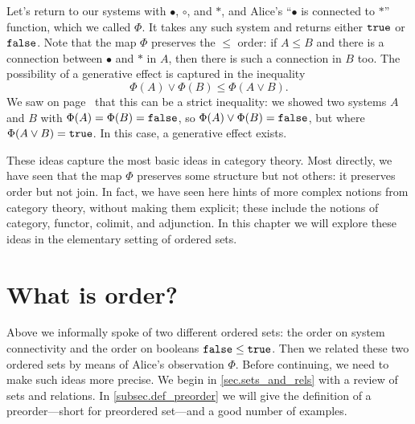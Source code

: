 \documentclass[7Sketches]{subfiles}
\begin{document}
Let's return to our systems with $\bullet$, $\circ$, and $\ast$, and Alice's
``$\bullet$ is connected to $\ast$'' function, which we called $\Phi$. It takes
any such system and returns either $\mathtt{true}$ or $\mathtt{false}$. Note that the map $\Phi$
preserves the $\leq$ order: if $A\leq B$ and there is a connection between
$\bullet$ and $\ast$ in $A$, then there is such a connection in $B$ too. The
possibility of a generative effect is captured in the inequality
\begin{equation}%
\label{eqn.generative_def}
\Phi(A) \vee \Phi(B) \leq \Phi(A\vee B).
\end{equation}
We saw on page~\pageref{page.generativity} that this can be a strict inequality: we showed two systems $A$ and $B$
with $\Phi(A)=\Phi(B)=\mathtt{false}$, so $\Phi(A)\vee\Phi(B)=\mathtt{false}$, but where
$\Phi(A\vee B)=\mathtt{true}$. In this case, a generative effect exists.%

These ideas capture the most basic ideas in category theory. Most directly, we have seen that the
map $\Phi$ preserves some structure but not others: it preserves order but not join. In fact, we
have seen here hints of more complex notions from category theory, without making them explicit;
these include the notions of category, functor, colimit, and adjunction. In this chapter we will
explore these ideas in the elementary setting of ordered sets.


\section{What is order?} %
\label{sec.preorders}

Above we informally spoke of two different ordered sets: the order on system
connectivity and the order on booleans $\mathtt{false}\leq\mathtt{true}$. Then we related these
two ordered sets by means of Alice's observation $\Phi$. Before continuing, we need
to make such ideas more precise. We begin in \cref{sec.sets_and_rels} with a
review of sets and relations. In \cref{subsec.def_preorder} we will give the
definition of a preorder---short for preordered set---and a good number
of examples.
\end{document}
